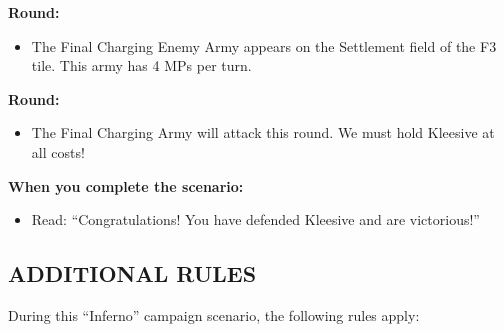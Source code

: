 \begin{multicols*}{2}
\textbf{ Round:}
\begin{itemize}
  \item The Final Charging Enemy Army appears on the Settlement field of the F3 tile. This army has 4 MPs per turn.
\end{itemize}

\textbf{ Round:}
\begin{itemize}
  \item The Final Charging Army will attack this round. We must hold Kleesive at all costs!
\end{itemize}

\textbf{When you complete the scenario:}
\begin{itemize}
  \item Read: ``Congratulations! You have defended Kleesive and are victorious!''
\end{itemize}

\subsection*{\MakeUppercase{Additional rules}}

During this ``Inferno'' campaign scenario, the following rules apply:


\end{multicols*}
